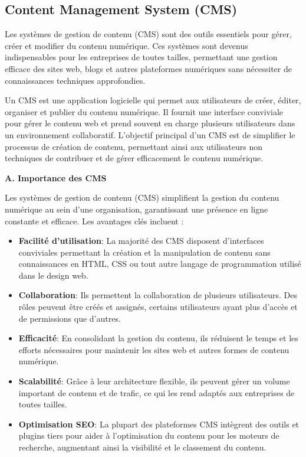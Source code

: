 \subsection{Content Management System (CMS)}


\hspace{\parindent}Les systèmes de gestion de contenu (CMS) sont des outils essentiels pour gérer, créer et modifier du contenu numérique. Ces systèmes sont devenus indispensables pour les entreprises de toutes tailles, permettant une gestion efficace des sites web, blogs et autres plateformes numériques sans nécessiter de connaissances techniques approfondies.

Un CMS est une application logicielle qui permet aux utilisateurs de créer, éditer, organiser et publier du contenu numérique. Il fournit une interface conviviale pour gérer le contenu web et prend souvent en charge plusieurs utilisateurs dans un environnement collaboratif. L'objectif principal d'un CMS est de simplifier le processus de création de contenu, permettant ainsi aux utilisateurs non techniques de contribuer et de gérer efficacement le contenu numérique.

\textbf{A. Importance des CMS}
    
Les systèmes de gestion de contenu (CMS) simplifient la gestion du contenu numérique au sein d'une organisation, garantissant une présence en ligne constante et efficace. Les avantages clés incluent :

\begin{itemize}
\item \textbf{Facilité d'utilisation}: La majorité des CMS disposent d'interfaces conviviales permettant la création et la manipulation de contenu sans connaissances en HTML, CSS ou tout autre langage de programmation utilisé dans le design web.

\item \textbf{Collaboration}: Ils permettent la collaboration de plusieurs utilisateurs. Des rôles peuvent être créés et assignés, certains utilisateurs ayant plus d'accès et de permissions que d'autres.


\item \textbf{Efficacité}: En consolidant la gestion du contenu, ils réduisent le temps et les efforts nécessaires pour maintenir les sites web et autres formes de contenu numérique.

\item \textbf{Scalabilité}: Grâce à leur architecture flexible, ils peuvent gérer un volume important de contenu et de trafic, ce qui les rend adaptés aux entreprises de toutes tailles.

\item \textbf{Optimisation SEO}: La plupart des plateformes CMS intègrent des outils et plugins tiers pour aider à l'optimisation du contenu pour les moteurs de recherche, augmentant ainsi la visibilité et le classement du contenu.
\end{itemize}

